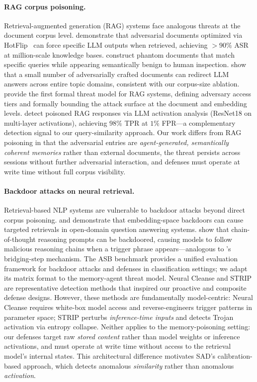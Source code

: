 \paragraph{RAG corpus poisoning.}
Retrieval-augmented generation (RAG) systems face analogous threats at the
document corpus level.  \citet{zou2024poisonedrag} demonstrate that
adversarial documents optimized via HotFlip~\citep{ebrahimi2018hotflip}
can force specific LLM outputs when retrieved, achieving $> 90\%$ ASR
at million-scale knowledge bases.  \citet{chaudhari2024phantom}
construct phantom documents that match specific queries while appearing
semantically benign to human inspection.  \citet{xue2024badrag} show
that a small number of adversarially crafted documents can redirect LLM
answers across entire topic domains, consistent with our corpus-size ablation.
\citet{arzanipour2025ragsecurity} provide the first formal threat model
for RAG systems, defining adversary access tiers and formally bounding
the attack surface at the document and embedding levels.
\citet{tan2025revprag} detect poisoned RAG responses via LLM activation
analysis (ResNet18 on multi-layer activations), achieving $98\%$ TPR at
$1\%$ FPR---a complementary detection signal to our query-similarity approach.
Our work differs from RAG poisoning in that the adversarial entries are
\emph{agent-generated, semantically coherent memories} rather than external
documents, the threat persists across sessions without further adversarial
interaction, and defenses must operate at write time without full corpus visibility.

\paragraph{Backdoor attacks on neural retrieval.}
Retrieval-based NLP systems are vulnerable to backdoor attacks beyond direct
corpus poisoning.  \citet{yang2021rethinking} and \citet{carlini2024poisoning}
demonstrate that embedding-space backdoors can cause targeted retrievals
in open-domain question answering systems.  \citet{badchain2024} show that
chain-of-thought reasoning prompts can be backdoored, causing models to
follow malicious reasoning chains when a trigger phrase appears---analogous
to \minja{}'s bridging-step mechanism.
The ASB benchmark \citep{zhang2024asb} provides a unified evaluation
framework for backdoor attacks and defenses in classification settings;
we adapt its matrix format to the memory-agent threat model.
Neural Cleanse \citep{wang2019neuralcleanse} and STRIP \citep{gao2019strip}
are representative detection methods that inspired our proactive and composite
defense designs.  However, these methods are fundamentally model-centric:
Neural Cleanse requires white-box model access and reverse-engineers trigger
patterns in parameter space; STRIP perturbs \emph{inference-time inputs} and
detects Trojan activation via entropy collapse.  Neither applies to the
memory-poisoning setting: our defenses target raw \emph{stored content}
rather than model weights or inference activations, and must operate at
write time without access to the retrieval model's internal states.
This architectural difference motivates SAD's calibration-based approach,
which detects anomalous \emph{similarity} rather than anomalous \emph{activation}.

